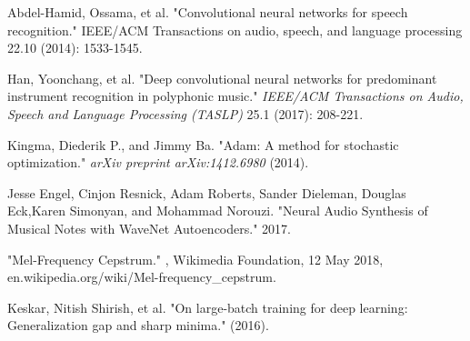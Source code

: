 \documentclass{article}
\begin{document}
\begin{thebibliography}{9}
Abdel-Hamid, Ossama, et al. "Convolutional neural networks for speech recognition." IEEE/ACM Transactions on audio, speech, and language processing 22.10 (2014): 1533-1545.

Han, Yoonchang, et al. "Deep convolutional neural networks for predominant instrument recognition in polyphonic music." \textit{IEEE/ACM Transactions on Audio, Speech and Language Processing (TASLP)} 25.1 (2017): 208-221.

Kingma, Diederik P., and Jimmy Ba. "Adam: A method for stochastic optimization." \textit{arXiv preprint arXiv:1412.6980} (2014).

Jesse Engel, Cinjon Resnick, Adam Roberts, Sander Dieleman, Douglas Eck,Karen Simonyan, and Mohammad Norouzi. "Neural Audio Synthesis of Musical Notes with WaveNet Autoencoders." 2017.

"Mel-Frequency Cepstrum." , Wikimedia Foundation, 12 May 2018, en.wikipedia.org/wiki/Mel-frequency\_cepstrum.

Keskar, Nitish Shirish, et al. "On large-batch training for deep learning: Generalization gap and sharp minima." (2016).

\end{thebibliography}
\end{document}
